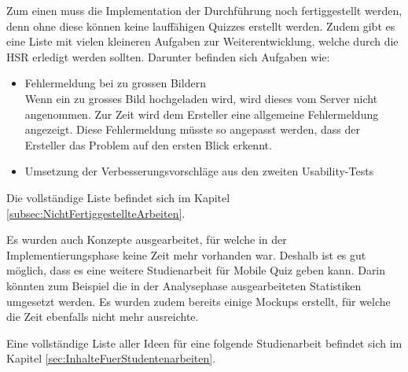 Zum einen muss die Implementation der Durchführung noch fertiggestellt werden, denn ohne diese können keine lauffähigen Quizzes erstellt werden. Zudem gibt es eine Liste mit vielen kleineren Aufgaben zur Weiterentwicklung, welche durch die HSR erledigt werden sollten. Darunter befinden sich Aufgaben wie:
\begin{itemize}
	\item Fehlermeldung bei zu grossen Bildern\\
	Wenn ein zu grosses Bild hochgeladen wird, wird dieses vom Server nicht angenommen. Zur Zeit wird dem Ersteller eine allgemeine Fehlermeldung angezeigt. Diese Fehlermeldung müsste so angepasst werden, dass der Ersteller das Problem auf den ersten Blick erkennt.
	\item Umsetzung der Verbesserungsvorschläge aus den zweiten Usability-Tests
\end{itemize}

\noindent Die vollständige Liste befindet sich im Kapitel \ref{subsec:NichtFertiggestellteArbeiten}.

\bigskip

Es wurden auch Konzepte ausgearbeitet, für welche in der Implementierungsphase keine Zeit mehr vorhanden war. Deshalb ist es gut möglich, dass es eine weitere Studienarbeit für Mobile Quiz geben kann. Darin könnten zum Beispiel die in der Analysephase ausgearbeiteten Statistiken umgesetzt werden. Es wurden zudem bereits einige Mockups erstellt, für welche die Zeit ebenfalls nicht mehr ausreichte.

\bigskip

\noindent Eine vollständige Liste aller Ideen für eine folgende Studienarbeit befindet sich im Kapitel \ref{sec:InhalteFuerStudentenarbeiten}.